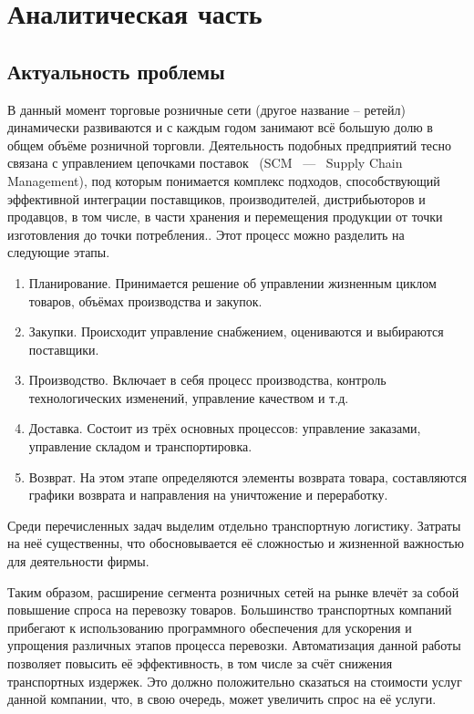 \section{Аналитическая часть}
\subsection{Актуальность проблемы}
	В данный момент торговые розничные сети (другое название -- ретейл) динамически развиваются и с каждым годом занимают всё большую долю в общем объёме розничной торговли\cite{subj:demand}. Деятельность подобных предприятий тесно связана с управлением цепочками поставок \, (SCM \, --- \, Supply Chain Management), под которым понимается комплекс подходов, способствующий эффективной интеграции поставщиков, производителей, дистрибьюторов и продавцов, в том числе, в части хранения и перемещения продукции от точки изготовления до точки потребления.. Этот процесс можно разделить на следующие этапы\cite{subj:scm}. 
	\begin{enumerate}
		\item Планирование. Принимается решение об управлении жизненным циклом товаров, объёмах производства и закупок.
		\item Закупки. Происходит управление снабжением, оцениваются и выбираются поставщики.
		\item Производство. Включает в себя процесс производства, контроль технологических изменений, управление качеством и т.д.
		\item Доставка. Состоит из трёх основных процессов: управление заказами, управление складом и транспортировка.
		\item Возврат. На этом этапе определяются элементы возврата товара, составляются графики возврата и направления на уничтожение и переработку.
	\end{enumerate}
	
	Среди перечисленных задач выделим отдельно  транспортную логистику. Затраты на неё существенны, что обосновывается её сложностью и жизненной важностью для деятельности фирмы. 
	
	Таким образом, расширение сегмента розничных сетей на рынке влечёт за собой повышение спроса на перевозку товаров. Большинство транспортных компаний прибегают к использованию программного обеспечения для ускорения и упрощения различных этапов процесса перевозки\cite{subj:auto_eff}.  Автоматизация данной работы позволяет повысить её эффективность, в том числе за счёт снижения транспортных издержек. Это должно положительно сказаться на стоимости услуг данной компании, что, в свою очередь, может увеличить спрос на её услуги.

